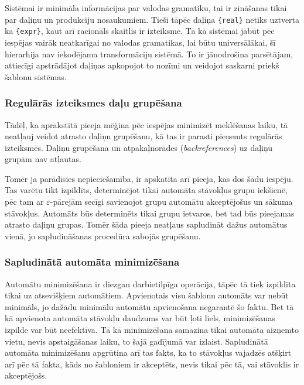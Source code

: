 Sistēmai ir minimāla informācijas par valodas gramatiku, tai ir zināšanas tikai par daļiņu un produkciju nosaukumiem. Tieši tāpēc daļiņa \verb|{real}| netiks uztverta ka \verb|{expr}|, kaut arī racionāls skaitlis ir izteiksme. Tā kā sistēmai jābūt pēc iespējas vairāk neatkarīgai no valodas gramatikas, lai būtu universālākai, šī hierarhija nav iekodējama transformāciju sistēmā. To ir jānodrošina parsētājam, attiecīgi apstrādājot daļiņas apkopojot to nozīmi un veidojot saskarni priekš šablonu sistēmas.%

\subsubsection{Regulārās izteiksmes daļu grupēšana}

Tādēļ, ka aprakstītā pieeja mēģina pēc iespējas minimizēt meklēšanas laiku, tā neatļauj veidot atrasto daļiņu grupēšanu, kā tas ir parasti pieņemts regulārās izteiksmēs. Daļiņu grupēšana un atpakaļnorādes (\emph{backreferences}) uz daļiņu grupām nav atļautas.

Tomēr ja parādīsies nepieciešamība, ir apskatīta arī pieeja, kas dos šādu iespēju. Tas varētu tikt izpildīts, determinējot tikai automāta stāvokļus grupu iekšienē, pēc tam ar $\varepsilon$-pārejām secīgi savienojot grupu automātu akceptējošus un sākuma stāvokļus. Automāts būs determinēts tikai grupu ietvaros, bet tad būs pieejamas atrasto daļiņu grupas. Tomēr šāda pieeja neatļaus sapludināt dažus automātus vienā, jo sapludināšanas procedūra sabojās grupēšanu.

\subsubsection{Sapludinātā automāta minimizēšana}

Automātu minimizēšana ir diezgan darbietilpīga operācija, tāpēc tā tiek izpildīta tikai uz atsevišķiem automātiem. Apvienotais visu šablonu automāts var nebūt minimāls, jo dažādu minimālu automātu apvienošana negarantē šo faktu. Bet tā kā apvienota automāta stāvokļu daudzums var būt ļoti liels, minimizēšanas izpilde var būt neefektīva. Tā kā minimizēšana samazina tikai automāta aizņemto vietu, nevis apstaigāšanas laiku, to šajā gadījumā var izlaist. Sapludinātā automāta minimizēšanu apgrūtina arī tas fakts, ka to stāvokļus vajadzēs atšķirt arī pēc tā fakta, kāds no šabloniem ir akceptēts, nevis tikai pēc tā, vai stāvoklis ir akceptējošs.

